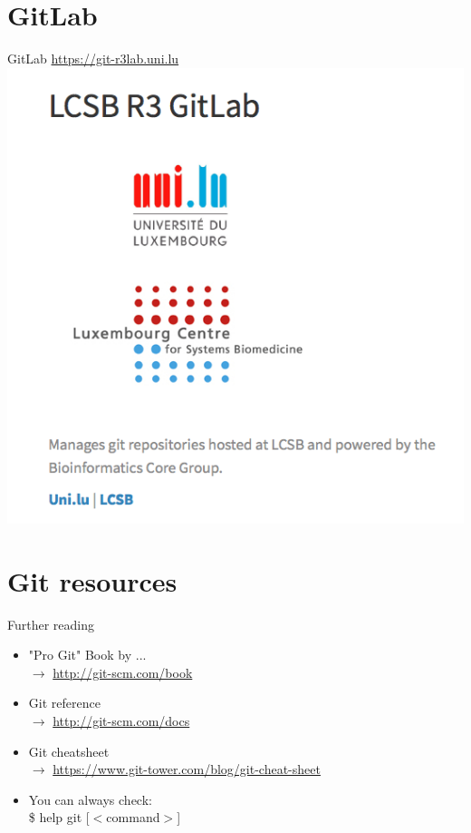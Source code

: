 \documentclass[10pt,xcolor=dvipsnames]{beamer}
\begin{document}
\section{GitLab}
\begin{frame}{GitLab}
\centering
\url{https://git-r3lab.uni.lu}\\[0.2in]
\includegraphics[height=0.70\paperheight]{gitlab.png} 
\end{frame}

\section{Git resources}
\begin{frame}{Further reading}
\begin{itemize}
  \setlength\itemsep{0.4in}
\item "Pro Git" Book by ... \\$\rightarrow$  \url{http://git-scm.com/book}
\item Git reference  \\ $\rightarrow$  \url{http://git-scm.com/docs}
\item Git cheatsheet  \\ $\rightarrow$ \url{https://www.git-tower.com/blog/git-cheat-sheet}
\item You can always check:\\
 \$ help git [$<$command$>$]
\end{itemize}
\end{frame}
\end{document}
